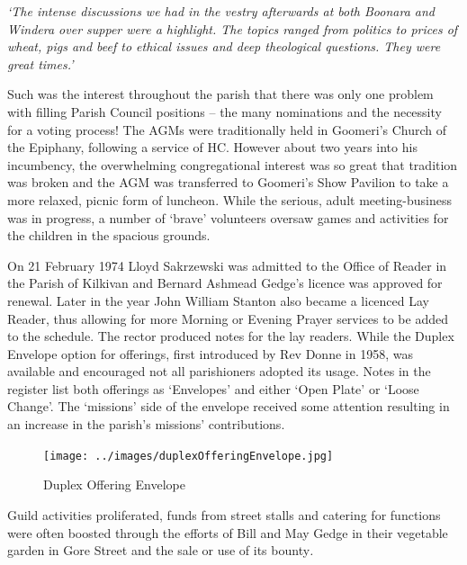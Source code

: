 \emph{`The intense discussions we had in the vestry afterwards at both Boonara and Windera over supper were a highlight. The topics ranged from politics to prices of wheat, pigs and beef to ethical issues and deep theological questions. They were great times.'}



Such was the interest throughout the parish that there was only one problem with filling Parish Council positions -- the many nominations and the necessity for a voting process! The AGMs were traditionally held in Goomeri's Church of the Epiphany, following a service of HC. However about two years into his incumbency, the overwhelming congregational interest was so great that tradition was broken and the AGM was transferred to Goomeri's Show Pavilion to take a more relaxed, picnic form of luncheon. While the serious, adult meeting-business was in progress, a number of `brave' volunteers oversaw games and activities for the children in the spacious grounds.



On 21 February 1974 Lloyd Sakrzewski was admitted to the Office of Reader in the Parish of Kilkivan and Bernard Ashmead Gedge's licence was approved for renewal. Later in the year John William Stanton also became a licenced Lay Reader, thus allowing for more Morning or Evening Prayer services to be added to the schedule. The rector produced notes for the lay readers. While the Duplex Envelope option for offerings, first introduced by Rev Donne in 1958, was available and encouraged not all parishioners adopted its usage. Notes in the register list both offerings as `Envelopes' and either `Open Plate' or `Loose Change'. The `missions' side of the envelope received some attention resulting in an increase in the parish's missions' contributions.









\begin{figure}
\begin{center}
\texttt{[image: ../images/duplexOfferingEnvelope.jpg]}
\caption{Duplex Offering Envelope}
\end{center}
\end{figure}




Guild activities proliferated, funds from street stalls and catering for functions were often boosted through the efforts of Bill and May Gedge in their vegetable garden in Gore Street and the sale or use of its bounty\emph{.}



